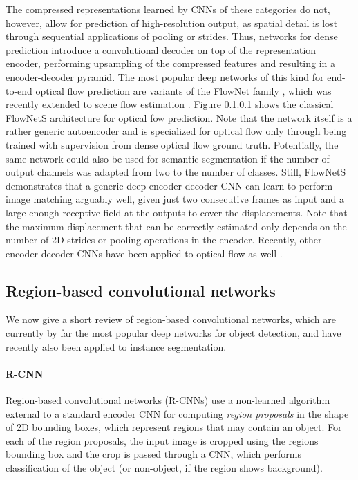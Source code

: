 The compressed representations learned by CNNs of these categories do not, however, allow
for prediction of high-resolution output, as spatial detail is lost through sequential applications
of pooling or strides.
Thus, networks for dense prediction introduce a convolutional decoder on top of the representation encoder,
performing upsampling of the compressed features and resulting in a encoder-decoder pyramid.
The most popular deep networks of this kind for end-to-end optical flow prediction
are variants of the FlowNet family \cite{FlowNet, FlowNet2},
which was recently extended to scene flow estimation \cite{SceneFlowDataset}.
Figure \ref{} shows the classical FlowNetS architecture for optical fow prediction.
Note that the network itself is a rather generic autoencoder and is specialized for optical flow only through being trained
with supervision from dense optical flow ground truth.
Potentially, the same network could also be used for semantic segmentation if
the number of output channels was adapted from two to the number of classes. %
Still, FlowNetS demonstrates that a generic deep encoder-decoder CNN can learn to perform image matching arguably well,
given just two consecutive frames as input and a large enough receptive field at the outputs to cover the displacements.
Note that the maximum displacement that can be correctly estimated only depends on the number of 2D strides or pooling
operations in the encoder.
Recently, other encoder-decoder CNNs have been applied to optical flow as well \cite{DenseNetDenseFlow}.

\subsection{Region-based convolutional networks}
We now give a short review of region-based convolutional networks, which are currently by far the
most popular deep networks for object detection, and have recently also been applied to instance segmentation.

\paragraph{R-CNN}
Region-based convolutional networks (R-CNNs) \cite{RCNN} use a non-learned algorithm external to a standard encoder CNN
for computing \emph{region proposals} in the shape of 2D bounding boxes, which represent regions that may contain an object.
For each of the region proposals, the input image is cropped using the regions bounding box and the crop is
passed through a CNN, which performs classification of the object (or non-object, if the region shows background). %

